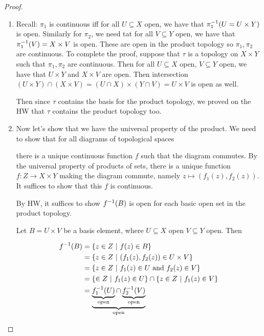 \documentclass[12pt, twosided]{article}
\begin{document}
\begin{proof}
  \begin{enumerate}
  \item Recall: \(\pi_1\) is continuous iff for all \(U \subseteq X\) open, we have that \(\pi_1^{-1}(U = U \times Y)\) is open. Similarly for \(\pi_2\), we need tat for all \(V \subseteq Y\) open, we have that \(\pi_1^{-1}(V) = X \times V\) is open. These are open in the product topology so \(\pi_1, \pi_2\) are continuous. To complete the proof, suppose that \(\tau\) is a topology on \(X \times Y\) such that \(\pi_1, \pi_2\) are continuous.  Then for all \(U \subseteq X\) open, \(V \subseteq Y\) open, we have that \(U \times Y\) and \(X \times V\) are open. Then intersection \((U \times Y) \cap (X \times V) = (U \cap X) \times (Y \cap V) = U \times V\) is open as well.

    Then since \(\tau\) contains the basis for the product topology, we proved on the HW that \(\tau\) contains the product topology too.
  \item Now let's show that we have the universal property of the product. We need to show that for all diagrams of topological spaces
    \begin{center}
    \end{center}
    
  there is a unique continuous function \(f\) such that the diagram commutes. By the universal property of products of sets, there is a unique function \(f: Z \to X \times Y\) making the diagram commute, namely \(z \mapsto (f_1(z), f_2(z))\). It suffices to show that this \(f\) is continuous.

  By HW, it suffices to show \(f^{-1}(B)\) is open for each basic open set in the product topology.

  Let \(B = U \times V\) be a basis element, where \(U \subseteq X\) open \(V \subseteq Y\) open. Then

  \begin{align*}
    f^{-1}(B) &= \left\{ z \in Z \ \middle\vert\  f(z) \in B \right\} \\
           &= \left\{ z \in Z \ \middle\vert\  (f_1(z), f_2(z)) \in U \times V \right\} \\
           &= \left\{ z \in Z \ \middle\vert\  f_1(z) \in U\ \mathrm{and}\ f_2(z) \in V \right\} \\
           &= \left\{ \in Z \ \middle\vert\  f_1(z) \in U \right\} \cap \left\{ z \in Z \ \middle\vert\  f_1(z) \in V \right\} \\
           &= \underbrace{\underbrace{f^{-1}_1(U)}_{\mathrm{open}} \cap \underbrace{f_2^{-1}(V)}_{\mathrm{open}}}_{\mathrm{open}}
  \end{align*}
\end{enumerate}
\end{proof}
\end{document}
